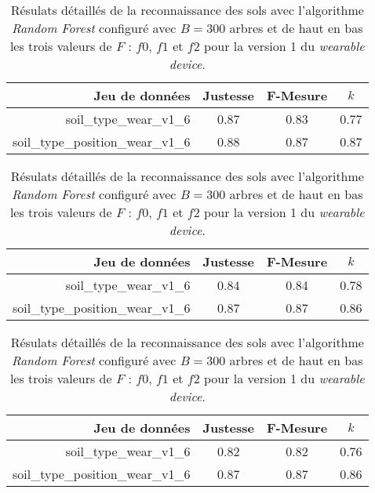 \begin{table}[H]\renewcommand{\arraystretch}{0.5}
	\centering
	\caption{Résulats détaillés de la reconnaissance des sols avec l'algorithme \textit{Random Forest} configuré avec $B=300$ arbres et de haut en bas les trois valeurs de $F$ : $f0$, $f1$ et $f2$ pour la version 1 du \textit{wearable device}.}
	\label{tab:rf-300-wear-v1}
	\begin{tabular}{@{}rccc@{}}
		\toprule
			\textbf{Jeu de données} & \textbf{Justesse} & \textbf{F-Mesure} & \textbf{$k$} \\
		\midrule
			soil\_type\_wear\_v1\_6 & 0.87 & 0.83 & 0.77 \\
			soil\_type\_position\_wear\_v1\_6 & 0.88 & 0.87 & 0.87 \\
	\end{tabular}
	\begin{tabular}{@{}rccc@{}}
		\toprule
			\textbf{Jeu de données} & \textbf{Justesse} & \textbf{F-Mesure} & \textbf{$k$} \\
		\midrule
			soil\_type\_wear\_v1\_6 & 0.84 & 0.84 & 0.78 \\
			soil\_type\_position\_wear\_v1\_6 & 0.87 & 0.87 & 0.86 \\
	\end{tabular}
	\begin{tabular}{@{}rccc@{}}
		\toprule
			\textbf{Jeu de données} & \textbf{Justesse} & \textbf{F-Mesure} & \textbf{$k$} \\
		\midrule
			soil\_type\_wear\_v1\_6 & 0.82 & 0.82 & 0.76 \\
			soil\_type\_position\_wear\_v1\_6 & 0.87 & 0.87 & 0.86 \\
		\bottomrule
	\end{tabular}
\end{table}

